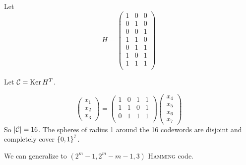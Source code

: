 \begin{example}
    Let
    \[
        H = \left(
            \begin{matrix}
                1 & 0 & 0\\
                0 & 1 & 0\\
                0 & 0 & 1\\
                1 & 1 & 0\\
                0 & 1 & 1\\
                1 & 0 & 1\\
                1 & 1 & 1\\
            \end{matrix}
        \right)
    \]
    
    Let $\mathcal{C} = \operatorname{Ker} H^T$.
    
    \[
        \left(
        \begin{matrix}
        x_1\\x_2\\x_3
        \end{matrix}
        \right) = \left( \begin{matrix}
        1&0&1&1\\
        1&1&0&1\\
        0&1&1&1\\
        \end{matrix} \right) \left( \begin{matrix}
        x_4\\x_5\\x_6\\x_7
        \end{matrix}\right)
    \]
    So $\left\lvert\mathcal{C}\right\rvert = 16$.
    The spheres of radius 1 around the 16 codewords are disjoint and completely cover $\left\{ 0,1 \right\}^7$.
\end{example}

We can generalize to $(2^m-1,2^m-m-1,3)$ \textsc{Hamming} code.














